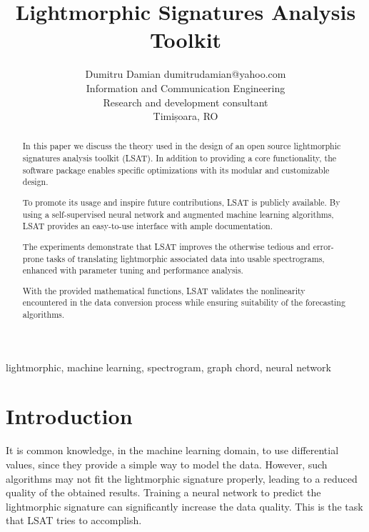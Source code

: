 \documentclass[twoside,11pt]{article}
\begin{document}
\title{Lightmorphic Signatures Analysis Toolkit}
\author{\name Dumitru Damian \email dumitrudamian@yahoo.com \\
       \addr Information and Communication Engineering\\
       \addr Research and development consultant\\
       \addr Timișoara, RO}
\maketitle
\begin{abstract}%
In this paper we discuss the theory used in the design of an open source lightmorphic signatures analysis toolkit (LSAT). In addition to providing a core functionality, the software package enables specific optimizations with its modular and customizable design.

To promote its usage and inspire future contributions, LSAT is publicly available. By using a self-supervised neural network and augmented machine learning algorithms, LSAT provides an easy-to-use interface with ample documentation. 

The experiments demonstrate that LSAT improves the otherwise tedious and error-prone tasks of translating lightmorphic associated data into usable spectrograms, enhanced with parameter tuning and performance analysis.  

With the provided mathematical functions, LSAT validates the nonlinearity encountered in the data conversion process while ensuring suitability of the forecasting algorithms.
\end{abstract}

\begin{keywords}
lightmorphic, machine learning, spectrogram, graph chord, neural network 
\end{keywords}
\section{Introduction} 
It is common knowledge, in the machine learning domain, to use differential values, since they provide a simple way to model the data. However, such algorithms may not fit the lightmorphic signature properly, leading to a reduced quality of the obtained results. Training a neural network to predict the lightmorphic signature can significantly increase the data quality. This is the task that LSAT tries to accomplish.
\end{document}

